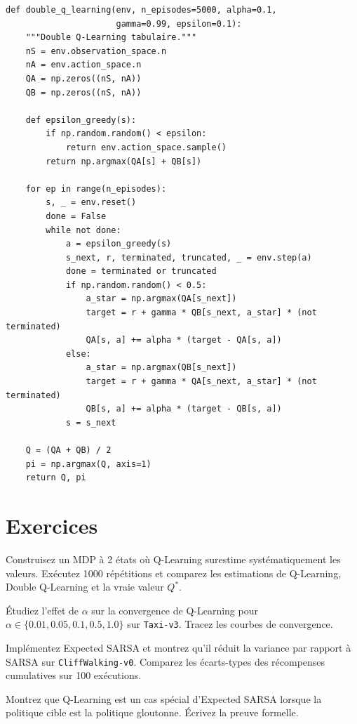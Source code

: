 \begin{codeblock}[title=\textbf{Double Q-Learning}]
\begin{verbatim}
def double_q_learning(env, n_episodes=5000, alpha=0.1,
                      gamma=0.99, epsilon=0.1):
    """Double Q-Learning tabulaire."""
    nS = env.observation_space.n
    nA = env.action_space.n
    QA = np.zeros((nS, nA))
    QB = np.zeros((nS, nA))

    def epsilon_greedy(s):
        if np.random.random() < epsilon:
            return env.action_space.sample()
        return np.argmax(QA[s] + QB[s])

    for ep in range(n_episodes):
        s, _ = env.reset()
        done = False
        while not done:
            a = epsilon_greedy(s)
            s_next, r, terminated, truncated, _ = env.step(a)
            done = terminated or truncated
            if np.random.random() < 0.5:
                a_star = np.argmax(QA[s_next])
                target = r + gamma * QB[s_next, a_star] * (not terminated)
                QA[s, a] += alpha * (target - QA[s, a])
            else:
                a_star = np.argmax(QB[s_next])
                target = r + gamma * QA[s_next, a_star] * (not terminated)
                QB[s, a] += alpha * (target - QB[s, a])
            s = s_next

    Q = (QA + QB) / 2
    pi = np.argmax(Q, axis=1)
    return Q, pi
\end{verbatim}
\end{codeblock}

\section{Exercices}

\begin{exercice}
Construisez un MDP \`a 2 \'etats o\`u Q-Learning surestime syst\'ematiquement
les valeurs. Ex\'ecutez 1000 r\'ep\'etitions et comparez les estimations de
Q-Learning, Double Q-Learning et la vraie valeur $Q^*$.
\end{exercice}

\begin{exercice}
\'Etudiez l'effet de $\alpha$ sur la convergence de Q-Learning pour
$\alpha \in \{0.01, 0.05, 0.1, 0.5, 1.0\}$ sur \texttt{Taxi-v3}.
Tracez les courbes de convergence.
\end{exercice}

\begin{exercice}
Impl\'ementez Expected SARSA et montrez qu'il r\'eduit la variance par rapport
\`a SARSA sur \texttt{CliffWalking-v0}. Comparez les \'ecarts-types des
r\'ecompenses cumulatives sur 100 ex\'ecutions.
\end{exercice}

\begin{exercice}
Montrez que Q-Learning est un cas sp\'ecial d'Expected SARSA lorsque la
politique cible est la politique gloutonne. \'Ecrivez la preuve formelle.
\end{exercice}
